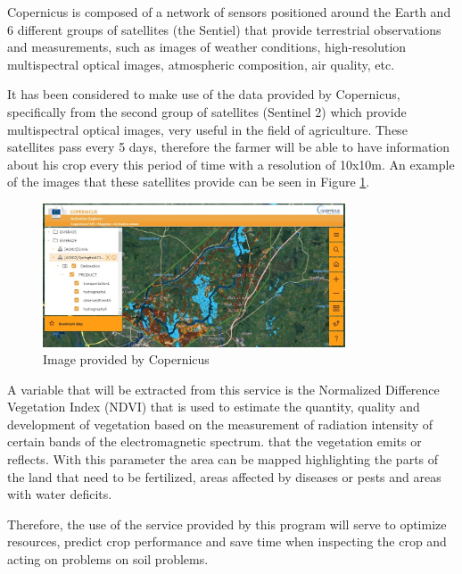 \begin{itemize}
    Copernicus is composed of a network of sensors positioned around the Earth and 6 different groups of satellites (the Sentiel) that provide terrestrial observations and measurements, such as images of weather conditions, high-resolution multispectral optical images, atmospheric composition, air quality, etc.
    
    It has been considered to make use of the data provided by Copernicus, specifically from the second group of satellites (Sentinel 2) which provide multispectral optical images, very useful in the field of agriculture. These satellites pass every 5 days, therefore the farmer will be able to have information about his crop every this period of time with a resolution of 10x10m. An example of the images that these satellites provide can be seen in Figure \ref{fig:copernicus}.
    
    \begin{figure}
        \centering
        \includegraphics[width=0.8\textwidth]{images/copernicus.jpeg}
        \caption{Image provided by Copernicus}
        \label{fig:copernicus}
    \end{figure} 
    
    A variable that will be extracted from this service is the Normalized Difference Vegetation Index (NDVI) that is used to estimate the quantity, quality and development of vegetation based on the measurement of radiation intensity of certain bands of the electromagnetic spectrum. that the vegetation emits or reflects. With this parameter the area can be mapped highlighting the parts of the land that need to be fertilized, areas affected by diseases or pests and areas with water deficits.
    
    Therefore, the use of the service provided by this program will serve to optimize resources, predict crop performance and save time when inspecting the crop and acting on problems on soil problems.
    
\end{itemize}
